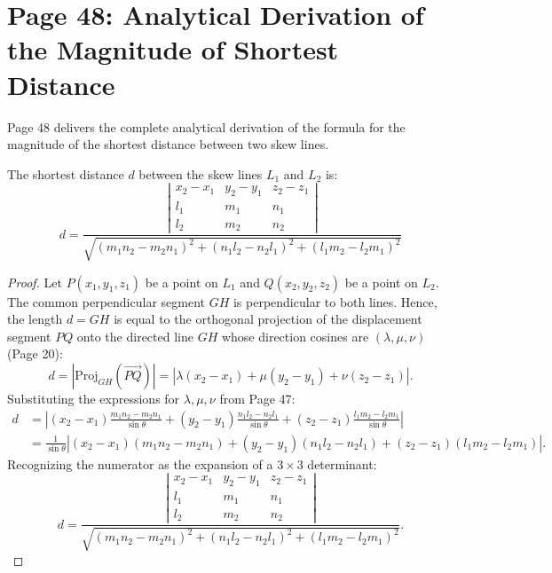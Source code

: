 \section{Page 48: Analytical Derivation of the Magnitude of Shortest Distance}
\label{sec:page48}

\begin{conceptbox}
Page 48 delivers the complete analytical derivation of the formula for the magnitude of the shortest distance between two skew lines.
\end{conceptbox}

\begin{theorembox}
The shortest distance $d$ between the skew lines $L_1$ and $L_2$ is:
\begin{equation}
    \boxed{d = \frac{\left|\begin{matrix}
    x_2 - x_1 & y_2 - y_1 & z_2 - z_1 \\
    l_1 & m_1 & n_1 \\
    l_2 & m_2 & n_2
    \end{matrix}\right|}{\sqrt{(m_1 n_2 - m_2 n_1)^2 + (n_1 l_2 - n_2 l_1)^2 + (l_1 m_2 - l_2 m_1)^2}}}
\end{equation}
\end{theorembox}

\begin{proof}
Let $P(x_1, y_1, z_1)$ be a point on $L_1$ and $Q(x_2, y_2, z_2)$ be a point on $L_2$.
The common perpendicular segment $GH$ is perpendicular to both lines.
Hence, the length $d = GH$ is equal to the orthogonal projection of the displacement segment $PQ$ onto the directed line $GH$ whose direction cosines are $(\lambda, \mu, \nu)$ (Page 20):
\begin{equation}
    d = |\text{Proj}_{GH}(\vec{PQ})| = |\lambda(x_2 - x_1) + \mu(y_2 - y_1) + \nu(z_2 - z_1)|.
\end{equation}
Substituting the expressions for $\lambda, \mu, \nu$ from Page 47:
\begin{align}
    d &= \left| (x_2 - x_1)\frac{m_1 n_2 - m_2 n_1}{\sin\theta} + (y_2 - y_1)\frac{n_1 l_2 - n_2 l_1}{\sin\theta} + (z_2 - z_1)\frac{l_1 m_2 - l_2 m_1}{\sin\theta} \right| \nonumber\\
    &= \frac{1}{\sin\theta} \left| (x_2 - x_1)(m_1 n_2 - m_2 n_1) + (y_2 - y_1)(n_1 l_2 - n_2 l_1) + (z_2 - z_1)(l_1 m_2 - l_2 m_1) \right|.
\end{align}
Recognizing the numerator as the expansion of a $3 \times 3$ determinant:
\begin{equation}
    d = \frac{\left|\begin{matrix}
    x_2 - x_1 & y_2 - y_1 & z_2 - z_1 \\
    l_1 & m_1 & n_1 \\
    l_2 & m_2 & n_2
    \end{matrix}\right|}{\sqrt{(m_1 n_2 - m_2 n_1)^2 + (n_1 l_2 - n_2 l_1)^2 + (l_1 m_2 - l_2 m_1)^2}}.
\end{equation}
\end{proof}

